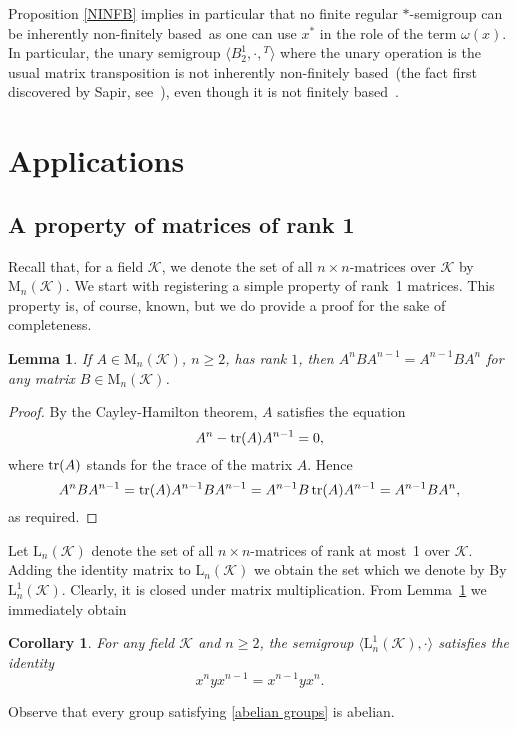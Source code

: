 \documentclass[11pt,reqno]{amsart}
\numberwithin{equation}{section}
\newtheorem{Lemma}[Thm]{Lemma}
\newtheorem{Cor}[Thm]{Corollary}
\theoremstyle{remark}
\def\om{\omega}
\def\fb{finitely based}
\begin{document}
Proposition \ref{NINFB} implies in particular that no finite
regular $*$-semigroup can be inherently non-\fb\ as one can use
$x^*$ in the role of the term $\om(x)$. In particular, the unary
semigroup $\langle B_2^1,\cdot,{}^T\rangle$ where the unary
operation is the usual matrix transposition is not inherently
non-\fb\ (the fact first discovered by Sapir,
see~\cite{sapirinverse}), even though it is not finitely
based~\cite{kleiman}.

\section{Applications}

\subsection{A property of matrices of rank 1}
Recall that, for a field $\mathcal{K}$, we denote the set of all
$n\times n$-matrices over $\mathcal{K}$ by
$\mathrm{M}_n(\mathcal{K})$. We start with registering a simple
property of rank~1 matrices. This property is, of course, known,
but we do provide a proof for the sake of completeness.
\begin{Lemma}
\label{rank 1} If $A\in\mathrm{M}_n(\mathcal{K})$, $n\ge2$, has
rank $1$, then $A^nBA^{n-1}=A^{n-1}BA^n$ for any matrix
$B\in\mathrm{M}_n(\mathcal{K})$.
\end{Lemma}

\begin{proof}
By the Cayley-Hamilton theorem, $A$ satisfies the equation
$$A^n-\operatorname{tr}(A)A^{n-1}=0,$$
where $\operatorname{tr}(A)$ stands for the trace of the matrix $A$. Hence
$$A^nBA^{n-1}=\operatorname{tr}(A)A^{n-1}BA^{n-1}=A^{n-1}B\operatorname{tr}(A)A^{n-1}=A^{n-1}BA^n,$$
as required.
\end{proof}

Let $\mathrm{L}_n(\mathcal{K})$ denote the set of all $n\times
n$-matrices of rank at most~1 over $\mathcal{K}$. Adding the
identity matrix to $\mathrm{L}_n(\mathcal{K})$ we obtain the set
which we denote by By $\mathrm{L}^1_n(\mathcal{K})$. Clearly, it
is closed under matrix multiplication. From Lemma~\ref{rank 1} we
immediately obtain
\begin{Cor}
\label{identity for rank 1} For any field $\mathcal{K}$ and
$n\ge2$, the semigroup
$\langle\mathrm{L}^1_n(\mathcal{K}),\cdot\rangle$ satisfies the
identity
\begin{equation}
\label{abelian groups} x^nyx^{n-1}=x^{n-1}yx^n.
\end{equation}
\end{Cor}
Observe that every group satisfying \eqref{abelian groups} is
abelian.
\end{document}
